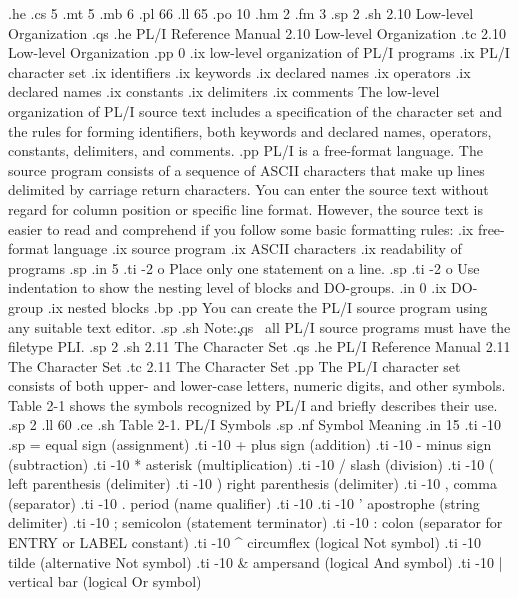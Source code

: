.he
.cs 5
.mt 5
.mb 6
.pl 66
.ll 65
.po 10
.hm 2
.fm 3
.sp 2
.sh
2.10  Low-level Organization
.qs
.he PL/I Reference Manual                2.10  Low-level Organization
.tc    2.10  Low-level Organization
.pp 0
.ix low-level organization of PL/I programs
.ix PL/I character set
.ix identifiers
.ix keywords
.ix declared names
.ix operators
.ix declared names
.ix constants
.ix delimiters
.ix comments
The low-level organization of PL/I source text includes a specification of 
the character set and the rules for forming identifiers, both keywords and 
declared names, operators, constants, delimiters, and comments.
.pp
PL/I is a free-format language.  The source program consists of a sequence 
of ASCII characters that make up lines delimited by carriage return characters.
You can enter the source text without regard for column position or specific 
line format.  However, the source text is easier to read and comprehend if you 
follow some basic formatting rules: 
.ix free-format language
.ix source program
.ix ASCII characters
.ix readability of programs
.sp 
.in 5
.ti -2
o Place only one statement on a line.
.sp
.ti -2
o Use indentation to show the nesting level of blocks and DO-groups.
.in 0
.ix DO-group
.ix nested blocks
.bp
.pp
You can create the PL/I source program using any suitable text editor.  
.sp
.sh
Note:\c
.qs
\  all PL/I source programs must have the filetype PLI.
.sp 2
.sh
2.11  The Character Set 
.qs
.he PL/I Reference Manual                     2.11  The Character Set    
.tc    2.11  The Character Set
.pp 
The PL/I character set consists of both upper- and lower-case letters, numeric 
digits, and other symbols.  Table 2-1 shows the symbols recognized by PL/I and 
briefly describes their use.
.sp 2
.ll 60
.ce
.sh
Table 2-1.  PL/I Symbols
.sp
.nf
    Symbol                     Meaning
.in 15
.ti -10
.sp
 =      equal sign (assignment)
.ti -10
 +      plus sign (addition)
.ti -10
 -      minus sign (subtraction)
.ti -10
 *      asterisk (multiplication) 
.ti -10
 /      slash (division) 
.ti -10
 (      left parenthesis (delimiter)
.ti -10
 )      right parenthesis (delimiter)
.ti -10
 ,      comma (separator)
.ti -10
 .      period (name qualifier)
.ti -10
.ti -10
 '      apostrophe (string delimiter)
.ti -10
 ;      semicolon (statement terminator)
.ti -10
 :      colon (separator for ENTRY or LABEL constant)
.ti -10
 ^      circumflex (logical Not symbol)
.ti -10
 ~      tilde (alternative Not symbol)
.ti -10
 &      ampersand (logical And symbol)
.ti -10
 |      vertical bar (logical Or symbol)       
